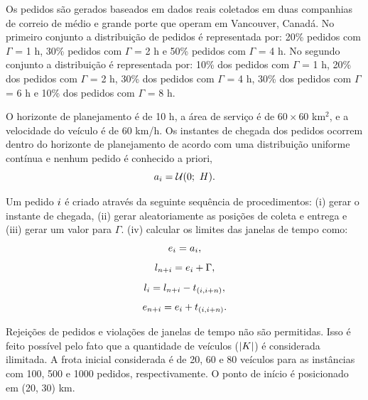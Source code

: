 Os pedidos são gerados baseados em dados reais coletados em duas companhias de 
correio de médio e grande porte que operam em Vancouver, Canadá.
No primeiro conjunto a distribuição de pedidos é representada por: 
20\% pedidos com $\Gamma$ = 1 h, 30\% pedidos com $\Gamma$ = 2 h e 
50\% pedidos com $\Gamma$ = 4 h.
No segundo conjunto a distribuição é representada por: 10\% dos pedidos com 
$\Gamma$ = 1 h, 20\% dos pedidos com $\Gamma$ = 2 h, 30\% dos pedidos com 
$\Gamma$ = 4 h, 30\% dos pedidos com $\Gamma$ = 6 h 
e 10\% dos pedidos com $\Gamma$ = 8 h.

O horizonte de planejamento é de 10 h, a área de serviço é de $60 \times 60$ 
km$^2$, e a velocidade do veículo é de 60 km/h. 
Os instantes de chegada dos pedidos ocorrem dentro do horizonte de planejamento
de acordo com uma distribuição uniforme contínua e nenhum pedido é conhecido 
a priori,
%
\begin{equation}
  a_i = \mathcal{U}(0;\ H).
\end{equation}


Um pedido $i$ é criado através da seguinte sequência de procedimentos: 
(i) gerar o instante de chegada, 
(ii) gerar aleatoriamente as posições de coleta e entrega e 
(iii) gerar um valor para $\Gamma$.
(iv) calcular os limites das janelas de tempo como:
%
\begin{equation}
  e_i = a_i,
\end{equation}
%
\begin{equation}
  l_{n + i} = e_i +
  \Gamma,
\end{equation}
%
\begin{equation}
  l_i = l_{n + i}
  - t_{(i,i+n)},
\end{equation}
%
\begin{equation}
  e_{n + i} = e_i
  + t_{(i,i+n)}.
\end{equation}

Rejeições de pedidos e violações de janelas de tempo não são permitidas. 
Isso é feito possível pelo fato que a quantidade de veículos 
($|K|$) é considerada ilimitada. 
A frota inicial considerada é de 20, 60 e 80 veículos para as instâncias com 
100, 500 e 1000 pedidos, respectivamente. 
O ponto de início é posicionado em (20, 30) km.




